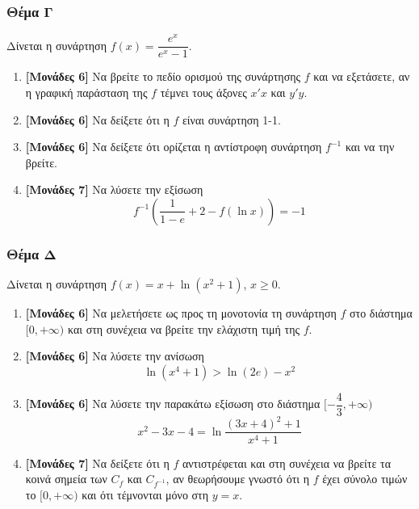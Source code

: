 \documentclass[12pt]{article}
\begin{document}
\section*{Θέμα Γ}
  \noindent
  Δίνεται η συνάρτηση $f(x)=\dfrac{e^x}{e^x-1}$.
  \begin{enumerate}
    \item \textbf{[Μονάδες 6]} Να βρείτε το πεδίο ορισμού της συνάρτησης $f$ και να εξετάσετε, αν η γραφική παράσταση της $f$ τέμνει τους άξονες $x'x$ και $y'y$.
    \item \textbf{[Μονάδες 6]} Να δείξετε ότι η $f$ είναι συνάρτηση 1-1.
    \item \textbf{[Μονάδες 6]} Να δείξετε ότι ορίζεται η αντίστροφη συνάρτηση $f^{-1}$ και να την βρείτε.
    \item \textbf{[Μονάδες 7]} Να λύσετε την εξίσωση
    $$f^{-1}\left(\frac{1}{1-e}+2-f(\ln x)\right)=-1$$
  \end{enumerate}

  \section*{Θέμα Δ}
    \noindent
    Δίνεται η συνάρτηση $f(x)=x+\ln(x^2+1)$, $x\ge 0$.
    \begin{enumerate}
      \item \textbf{[Μονάδες 6]} Να μελετήσετε ως προς τη μονοτονία τη συνάρτηση $f$ στο διάστημα $[0,+\infty)$ και στη συνέχεια να βρείτε την ελάχιστη τιμή της $f$.
      \item \textbf{[Μονάδες 6]} Να λύσετε την ανίσωση
      $$\ln (x^4+1)>\ln (2e)-x^2$$
      \item \textbf{[Μονάδες 6]} Να λύσετε την παρακάτω εξίσωση στο διάστημα $[-\dfrac{4}{3},+\infty)$
$$x^2-3x-4=\ln \dfrac{(3x+4)^2+1}{x^4+1}$$
      \item \textbf{[Μονάδες 7]} Να δείξετε ότι η $f$ αντιστρέφεται και στη συνέχεια να βρείτε τα κοινά σημεία των $C_f$ και $C_{f^{-1}}$, αν θεωρήσουμε γνωστό ότι η $f$ έχει σύνολο τιμών το $[0,+\infty)$ και ότι τέμνονται μόνο στη $y=x$.
    \end{enumerate}

\vspace{2\baselineskip}

\part*{}
\end{document}
